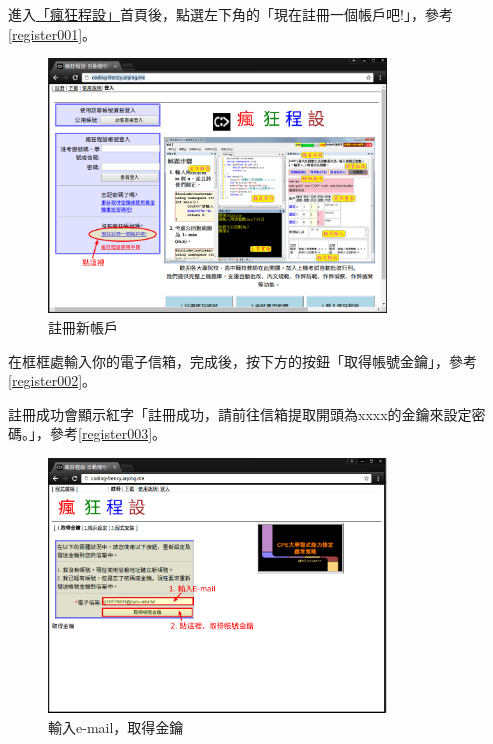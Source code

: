 進入\href{http://coding-frenzy.arping.me/}{「瘋狂程設」}首頁後，點選左下角的「現在註冊一個帳戶吧!」，參考\autoref{register001}。
\begin{figure}[H]
	\centering
	\includegraphics[width=0.8\textwidth]{fig/install_and_setting/register_001}
	\caption{註冊新帳戶}
	\label{register001}
\end{figure}

在框框處輸入你的電子信箱，完成後，按下方的按鈕「取得帳號金鑰」，參考\autoref{register002}。

註冊成功會顯示紅字「註冊成功，請前往信箱提取開頭為xxxx的金鑰來設定密碼。」，參考\autoref{register003}。
\begin{figure}[H]
	\centering
	\includegraphics[width=0.8\textwidth]{fig/install_and_setting/register_002}
	\caption{輸入e-mail，取得金鑰}
	\label{register002}
\end{figure}



